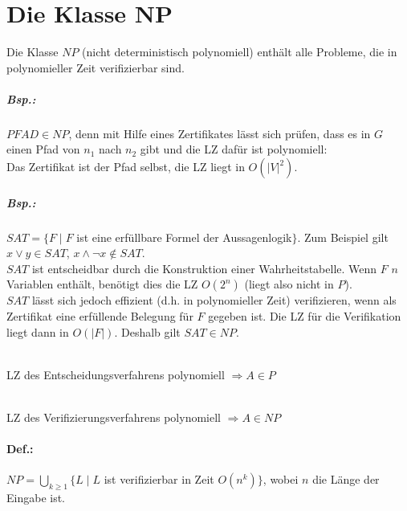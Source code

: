\section{Die Klasse NP}
Die Klasse $NP$ (nicht deterministisch polynomiell) enthält alle Probleme, die in polynomieller Zeit verifizierbar sind.
\subparagraph{Bsp.:} $PFAD \in NP$, denn mit Hilfe eines Zertifikates lässt sich prüfen, dass es in $G$ einen Pfad von $n_1$ nach $n_2$ gibt und die LZ dafür ist polynomiell:\\
Das Zertifikat ist der Pfad selbst, die LZ liegt in $O(|V|^2)$.
\subparagraph{Bsp.:} $SAT=\{F\;|\;F$ ist eine erfüllbare Formel der Aussagenlogik$\}$. Zum Beispiel gilt $x\vee y \in SAT$, $x\wedge \neg x \not \in SAT$.\\
$SAT$ ist entscheidbar durch die Konstruktion einer Wahrheitstabelle. Wenn $F$ $n$ Variablen enthält, benötigt dies die LZ $O(2^n)$ (liegt also nicht in $P$).\\
$SAT$ lässt sich jedoch effizient (d.h. in polynomieller Zeit) verifizieren, wenn als Zertifikat eine erfüllende Belegung für $F$ gegeben ist. Die LZ für die Verifikation liegt dann in $O(|F|)$. Deshalb gilt $SAT \in NP$.\\
\\
LZ des Entscheidungsverfahrens polynomiell $\Rightarrow A \in P$ \\
\\
LZ des Verifizierungsverfahrens polynomiell $\Rightarrow A \in NP$
\paragraph{Def.:} $NP = \bigcup_{k\geq 1}\{L\;|\; L$ ist verifizierbar in Zeit $O(n^k)\}$, wobei $n$ die Länge der Eingabe ist.

